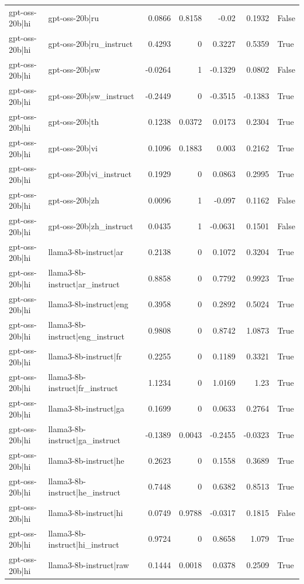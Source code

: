\begin{table}
\begin{tabular}{l l r r r r l}
gpt-oss-20b|hi & gpt-oss-20b|ru & 0.0866 & 0.8158 & -0.02 & 0.1932 & False \\
gpt-oss-20b|hi & gpt-oss-20b|ru_instruct & 0.4293 & 0 & 0.3227 & 0.5359 & True \\
gpt-oss-20b|hi & gpt-oss-20b|sw & -0.0264 & 1 & -0.1329 & 0.0802 & False \\
gpt-oss-20b|hi & gpt-oss-20b|sw_instruct & -0.2449 & 0 & -0.3515 & -0.1383 & True \\
gpt-oss-20b|hi & gpt-oss-20b|th & 0.1238 & 0.0372 & 0.0173 & 0.2304 & True \\
gpt-oss-20b|hi & gpt-oss-20b|vi & 0.1096 & 0.1883 & 0.003 & 0.2162 & True \\
gpt-oss-20b|hi & gpt-oss-20b|vi_instruct & 0.1929 & 0 & 0.0863 & 0.2995 & True \\
gpt-oss-20b|hi & gpt-oss-20b|zh & 0.0096 & 1 & -0.097 & 0.1162 & False \\
gpt-oss-20b|hi & gpt-oss-20b|zh_instruct & 0.0435 & 1 & -0.0631 & 0.1501 & False \\
gpt-oss-20b|hi & llama3-8b-instruct|ar & 0.2138 & 0 & 0.1072 & 0.3204 & True \\
gpt-oss-20b|hi & llama3-8b-instruct|ar_instruct & 0.8858 & 0 & 0.7792 & 0.9923 & True \\
gpt-oss-20b|hi & llama3-8b-instruct|eng & 0.3958 & 0 & 0.2892 & 0.5024 & True \\
gpt-oss-20b|hi & llama3-8b-instruct|eng_instruct & 0.9808 & 0 & 0.8742 & 1.0873 & True \\
gpt-oss-20b|hi & llama3-8b-instruct|fr & 0.2255 & 0 & 0.1189 & 0.3321 & True \\
gpt-oss-20b|hi & llama3-8b-instruct|fr_instruct & 1.1234 & 0 & 1.0169 & 1.23 & True \\
gpt-oss-20b|hi & llama3-8b-instruct|ga & 0.1699 & 0 & 0.0633 & 0.2764 & True \\
gpt-oss-20b|hi & llama3-8b-instruct|ga_instruct & -0.1389 & 0.0043 & -0.2455 & -0.0323 & True \\
gpt-oss-20b|hi & llama3-8b-instruct|he & 0.2623 & 0 & 0.1558 & 0.3689 & True \\
gpt-oss-20b|hi & llama3-8b-instruct|he_instruct & 0.7448 & 0 & 0.6382 & 0.8513 & True \\
gpt-oss-20b|hi & llama3-8b-instruct|hi & 0.0749 & 0.9788 & -0.0317 & 0.1815 & False \\
gpt-oss-20b|hi & llama3-8b-instruct|hi_instruct & 0.9724 & 0 & 0.8658 & 1.079 & True \\
gpt-oss-20b|hi & llama3-8b-instruct|raw & 0.1444 & 0.0018 & 0.0378 & 0.2509 & True \\

\end{tabular}
\end{table}
